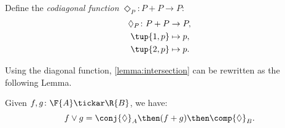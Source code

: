 \begin{definition}
Define the \emph{codiagonal function} $\Diamond_P\colon P+P \to P $:
\begin{equation}
\begin{aligned}
    \Diamond_P \colon P + P & \to P,  \\
            \tup{1,p} & \mapsto p, \\
            \tup{2,p} & \mapsto p.
\end{aligned}
\end{equation}
\end{definition}



Using the diagonal function, \cref{lemma:intersection} can be rewritten as the following Lemma.

\begin{lemma}
    Given $f, g\colon \F{A} \tickar \R{B}$, we have:
    \begin{equation}
        f \vee g =  \conj{\Diamond}_A \then (f + g)\then \comp{\Diamond}_B.
    \end{equation}
\end{lemma}

